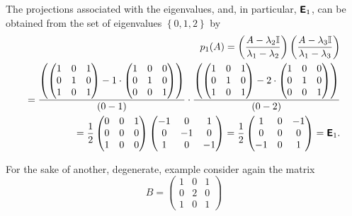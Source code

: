 {The projections associated with the eigenvalues, and, in particular, $\textsf{\textbf{E}}_1$,
can be obtained from  the set of eigenvalues $\left\{  0,1,2 \right\}$ by
\begin{equation}
\begin{split}
p_1(A)=
\left( \frac{A-\lambda_2{\Bbb I}}{\lambda_1-\lambda_2} \right)
\left( \frac{A-\lambda_3{\Bbb I}}{\lambda_1-\lambda_3} \right) \\
=
\frac{
\left(
\begin{pmatrix}
1&0&1\\
0&1&0\\
1&0&1
\end{pmatrix}
-
1\cdot
\begin{pmatrix}
1&0&0\\
0&1&0\\
0&0&1
\end{pmatrix}
\right)}
{(0-1)}
\cdot
\frac{
\left(
\begin{pmatrix}
1&0&1\\
0&1&0\\
1&0&1
\end{pmatrix}
-
2\cdot
\begin{pmatrix}
1&0&0\\
0&1&0\\
0&0&1
\end{pmatrix}
\right)}
{(0-2)}
\\
=
\frac{1}{2}
\begin{pmatrix}
0&0&1\\
0&0&0\\
1&0&0
\end{pmatrix}
\begin{pmatrix}
-1&0&1\\
0&-1&0\\
1&0&-1
\end{pmatrix}
=
\frac{1}{2}
\begin{pmatrix}
1&0&-1\\
0&0&0\\
-1&0&1
\end{pmatrix}
=\textsf{\textbf{E}}_1.
\end{split}
\end{equation}

For the sake of another, degenerate, example consider again the
{matrix}
\begin{equation}
B=
\begin{pmatrix}
1&0&1\\
0&2&0\\
1&0&1
\end{pmatrix}
\end{equation}



}
